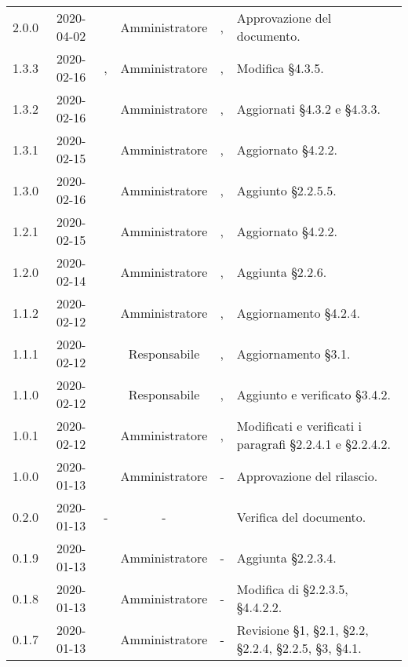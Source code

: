 {\begin{longtable}{ c c  C{2.3cm} c C{3cm} C{3.2cm}}
2.0.0 & 2020-04-02 & \LD{} & Amministratore & \CE{}, \MC{} & Approvazione del documento. \\

1.3.3 & 2020-02-16 & \DF{}, \PF{} & Amministratore & \CE{}, \MC{} & Modifica §4.3.5. \\

1.3.2 & 2020-02-16 & \SE{} & Amministratore & \CE{}, \MC{} & Aggiornati §4.3.2 e §4.3.3. \\

1.3.1 & 2020-02-15 & \SE{} & Amministratore & \CE{}, \MC{} & Aggiornato §4.2.2. \\

1.3.0 & 2020-02-16 & \SE{} & Amministratore & \CE{}, \MC{} & Aggiunto §2.2.5.5. \\

1.2.1 & 2020-02-15 & \SE{} & Amministratore & \CE{}, \MC{} & Aggiornato §4.2.2. \\

1.2.0 & 2020-02-14 & \SE{} & Amministratore & \CE{}, \MC{} & Aggiunta §2.2.6. \\

1.1.2 & 2020-02-12 & \SE{} & Amministratore & \CE{}, \MC{} & Aggiornamento §4.2.4. \\ 

1.1.1 & 2020-02-12 & \BR{} & Responsabile & \CE{}, \MC{} & Aggiornamento §3.1. \\ 

1.1.0 & 2020-02-12 & \BR{} & Responsabile & \CE{}, \MC{} & Aggiunto e verificato §3.4.2. \\

1.0.1 & 2020-02-12 & \SE{} & Amministratore & \CE{}, \MC{} & Modificati e verificati i paragrafi §2.2.4.1 e §2.2.4.2. \\ 

1.0.0 & 2020-01-13 & \AT{} & Amministratore & - & Approvazione del  rilascio.  \\

0.2.0 & 2020-01-13 & - & - & \PF{} & Verifica del documento.  \\ 

0.1.9 & 2020-01-13 & \CE{} & Amministratore & - & Aggiunta §2.2.3.4. \\

0.1.8 & 2020-01-13 & \BR{} & Amministratore & - & Modifica di §2.2.3.5, §4.4.2.2. \\

0.1.7 & 2020-01-13 & \AT{} & Amministratore & - & Revisione §1, §2.1, §2.2, §2.2.4, §2.2.5, §3, §4.1. \\


\end{longtable}}
